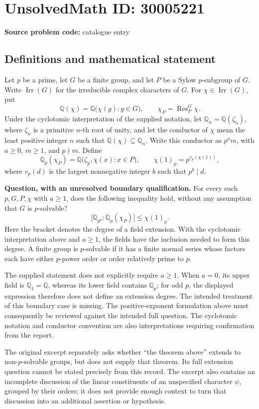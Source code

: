 \documentclass[11pt]{article}
\newcommand{\Q}{\mathbb{Q}}
\begin{document}
\section*{UnsolvedMath ID: 30005221}
\textbf{Source problem code:} catalogue entry
\subsection{Definitions and mathematical statement}
Let \(p\) be a prime, let \(G\) be a finite group, and let \(P\) be a Sylow \(p\)-subgroup of \(G\). Write \(\operatorname{Irr}(G)\) for the irreducible complex characters of \(G\). For \(\chi\in\operatorname{Irr}(G)\), put
\[
\Q(\chi)=\Q\bigl(\chi(g):g\in G\bigr),\qquad \chi_P=\operatorname{Res}^{G}_{P}\chi.
\]
Under the cyclotomic interpretation of the supplied notation, let \(\Q_n=\Q(\zeta_n)\), where \(\zeta_n\) is a primitive \(n\)-th root of unity, and let the conductor of \(\chi\) mean the least positive integer \(n\) such that \(\Q(\chi)\subseteq\Q_n\). Write this conductor as \(p^a m\), with \(a\geq0\), \(m\geq1\), and \(p\nmid m\). Define
\[
\Q_p(\chi_P)=\Q\bigl(\zeta_p,\chi(x):x\in P\bigr),
\qquad
\chi(1)_p=p^{v_p(\chi(1))},
\]
where \(v_p(d)\) is the largest nonnegative integer \(b\) such that \(p^b\mid d\).

\textbf{Question, with an unresolved boundary qualification.} For every such \(p,G,P,\chi\) with \(a\geq1\), does the following inequality hold, without any assumption that \(G\) is \(p\)-solvable?
\[
\bigl[\Q_{p^a}:\Q_p(\chi_P)\bigr]\leq\chi(1)_p.
\]
Here the bracket denotes the degree of a field extension. With the cyclotomic interpretation above and \(a\geq1\), the fields have the inclusion needed to form this degree. A finite group is \(p\)-solvable if it has a finite normal series whose factors each have either \(p\)-power order or order relatively prime to \(p\).

The supplied statement does not explicitly require \(a\geq1\). When \(a=0\), its upper field is \(\Q_1=\Q\), whereas its lower field contains \(\Q_p\); for odd \(p\), the displayed expression therefore does not define an extension degree. The intended treatment of this boundary case is missing. The positive-exponent formulation above must consequently be reviewed against the intended full question. The cyclotomic notation and conductor convention are also interpretations requiring confirmation from the report.

The original excerpt separately asks whether ``the theorem above'' extends to non-\(p\)-solvable groups, but does not supply that theorem. Its full extension question cannot be stated precisely from this record. The excerpt also contains an incomplete discussion of the linear constituents of an unspecified character \(\psi\), grouped by their orders; it does not provide enough context to turn that discussion into an additional assertion or hypothesis.
\end{document}
